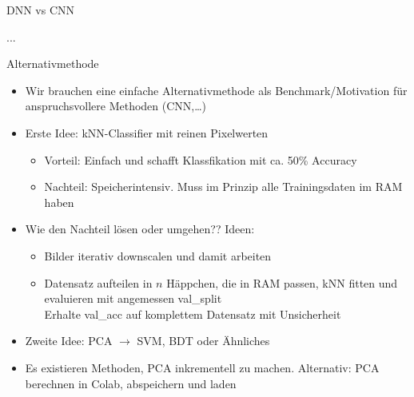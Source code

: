 \documentclass[aspectratio=1610, 9pt]{beamer}
\begin{document}
\begin{frame}{DNN vs CNN}

  ...

\end{frame}

\begin{frame}{Alternativmethode}

  \begin{itemize}
    \item Wir brauchen eine einfache Alternativmethode als Benchmark/Motivation für anspruchsvollere Methoden (CNN,\ldots)
    \item Erste Idee: kNN-Classifier mit reinen Pixelwerten
    \begin{itemize}
      \item Vorteil: Einfach und schafft Klassfikation mit ca. 50\% Accuracy
      \item Nachteil: Speicherintensiv. Muss im Prinzip alle Trainingsdaten im RAM haben
    \end{itemize}
    \item Wie den Nachteil lösen oder umgehen?? Ideen:
    \begin{itemize}
      \item Bilder iterativ downscalen und damit arbeiten
      \item Datensatz aufteilen in $n$ Häppchen, die in RAM passen, kNN fitten und evaluieren mit angemessen val\_split\\
      \rightarrow{} Erhalte val\_acc auf komplettem Datensatz mit Unsicherheit
    \end{itemize}
    \item Zweite Idee: PCA $\to$ SVM, BDT oder Ähnliches
    \item Es existieren Methoden, PCA inkrementell zu machen. Alternativ: PCA berechnen in Colab, abspeichern und laden
  \end{itemize}

\end{frame}
\end{document}
